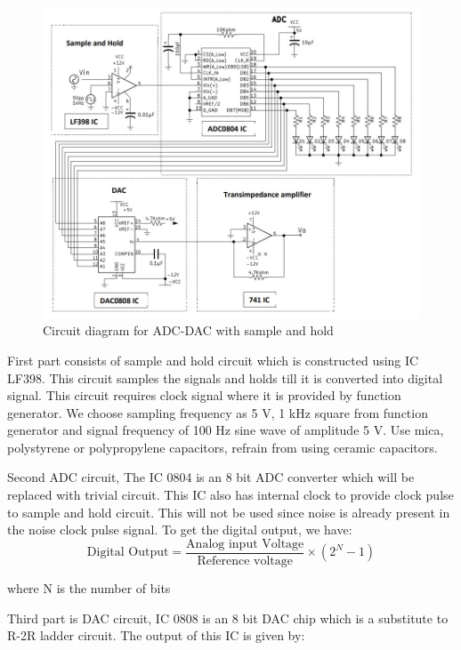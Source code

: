 \documentclass[a4paper, amsfonts, amssymb, amsmath, reprint, showkeys, nofootinbib, twoside]{revtex4-1}
\begin{document}
\begin{figure}[H]
	\centering
	\includegraphics[scale=0.3]{21} 
	\caption{Circuit diagram for ADC-DAC with sample and hold}
	\label{1}
\end{figure}

First part consists of sample and hold circuit which is constructed using IC LF398. This circuit samples the signals and holds till it is converted into digital signal. This circuit requires clock signal where it is provided by function generator.  We choose sampling frequency as 5 V, 1 kHz square from function generator and signal frequency of 100 Hz sine wave of amplitude 5 V. Use mica, polystyrene or polypropylene capacitors, refrain from using ceramic capacitors.

Second ADC circuit, The IC 0804 is an 8 bit ADC converter which will be replaced with trivial circuit. This IC also has internal clock to provide clock pulse to sample and hold circuit. This will not be used since noise is already present in the noise clock pulse signal. 
To get the digital output, we have:
\begin{equation}
	\text{Digital Output}=\frac{\text{Analog input Voltage}}{\text{Reference voltage}}\times(2^N-1)
\end{equation}

where N is the number of bits

Third part is DAC circuit, IC 0808 is an 8 bit DAC chip which is a substitute to R-2R ladder circuit. The output of this IC is given by:
\end{document}
